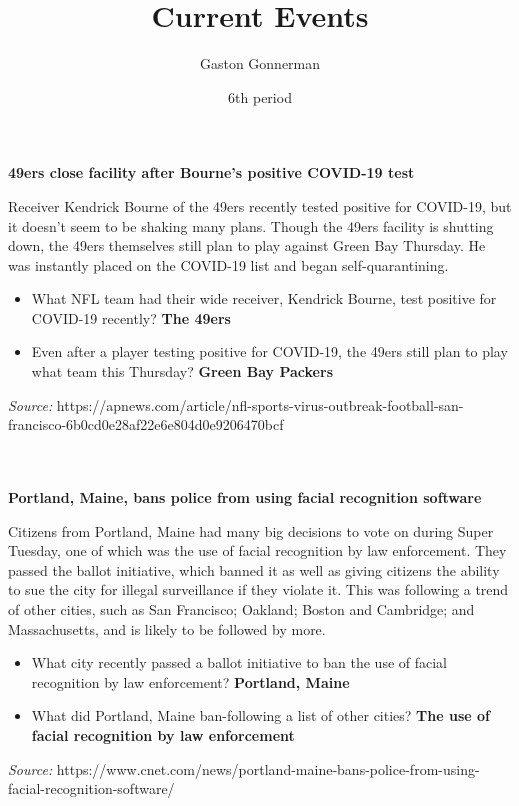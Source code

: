 \documentclass{article}
\title{Current Events}
\author{Gaston Gonnerman}
\date{6th period}
\begin{document}
	\maketitle
	
	\begin{center}
		\large{
			\textbf{49ers close facility after Bourne’s positive COVID-19 test}
		}
	\end{center}
	\par Receiver Kendrick Bourne of the 49ers recently tested positive for COVID-19, but it doesn't seem to be shaking many plans. Though the 49ers facility is shutting down, the 49ers themselves still plan to play against Green Bay Thursday. He was instantly placed on the COVID-19 list and began self-quarantining.
	
	\begin{itemize}[label=--]
		\item What NFL team had their wide receiver, Kendrick Bourne, test positive for COVID-19 recently? \textbf{The 49ers}
		\item Even after a player testing positive for COVID-19, the 49ers still plan to play what team this Thursday? \textbf{Green Bay Packers}
	\end{itemize}

	\noindent
	\emph{Source:} https://apnews.com/article/nfl-sports-virus-outbreak-football-san-francisco-6b0cd0e28af22e6e804d0e9206470bcf
	\\ \\ \\
	
	\begin{center}
		\large{
			\textbf{Portland, Maine, bans police from using facial recognition software}
		}
	\end{center}
	\par Citizens from Portland, Maine had many big decisions to vote on during Super Tuesday, one of which was the use of facial recognition by law enforcement. They passed the ballot initiative, which banned it as well as giving citizens the ability to sue the city for illegal surveillance if they violate it. This was following a trend of other cities, such as San Francisco; Oakland; Boston and Cambridge; and Massachusetts, and is likely to be followed by more.
	
	\begin{itemize}[label=--]
		\item What city recently passed a ballot initiative to ban the use of facial recognition by law enforcement? \textbf{Portland, Maine}
		\item What did Portland, Maine ban-following a list of other cities? \textbf{The use of facial recognition by law enforcement}
	\end{itemize}

	\noindent
	\emph{Source:} https://www.cnet.com/news/portland-maine-bans-police-from-using-facial-recognition-software/
\end{document}
